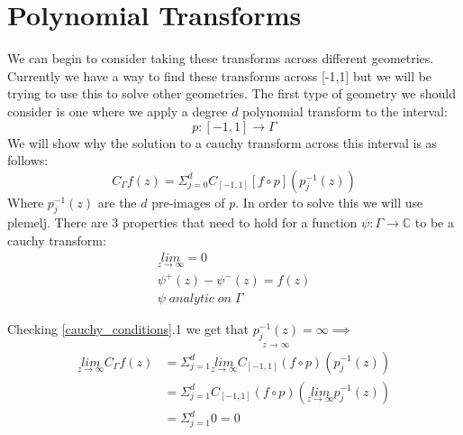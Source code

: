 \documentclass{article}
\begin{document}
\section{Polynomial Transforms}
We can begin to consider taking these transforms across different geometries.
Currently we have a way to find these transforms across [-1,1] but we will be trying to use this to solve other geometries.
The first type of geometry we should consider is one where we apply a degree $d$ polynomial transform to the interval:
$$p:[-1,1]\rightarrow \Gamma$$
We will show why the solution to a cauchy transform across this interval is as follows:
\begin{equation}
C_\Gamma f(z) = \Sigma_{j=0}^dC_{[-1,1]}[f\circ p](p_j^{-1}(z))
\end{equation}
Where $p_j^{-1}(z)$ are the $d$ pre-images of $p$.
In order to solve this we will use plemelj.
There are 3 properties that need to hold for a function $\psi: \Gamma \rightarrow \mathbb{C}$ to be a cauchy transform:
\begin{equation}\label{cauchy_conditions}\begin{gathered}
\underset{z\to\infty}{lim}= 0 \\
\psi^+(z)-\psi^-(z)= f(z) \\
\psi\;analytic\;on\;\Gamma 
\end{gathered}\end{equation}

Checking \eqref{cauchy_conditions}.1 we get that $\underset{z\to\infty}{p_j^{-1}(z)} = \infty \implies$
\begin{equation}\begin{split}
\underset{z\to\infty}{lim}C_\Gamma f(z) &= \Sigma_{j=1}^d \underset{z\to\infty}{lim}C_{[-1,1]}(f\circ p)(p_j^{-1}(z)) \\
&= \Sigma_{j=1}^d C_{[-1,1]}(f\circ p)(\underset{z\to\infty}{lim} p_j^{-1}(z)) \\
&= \Sigma_{j=1}^d 0 = 0
\end{split}\end{equation}
\end{document}
